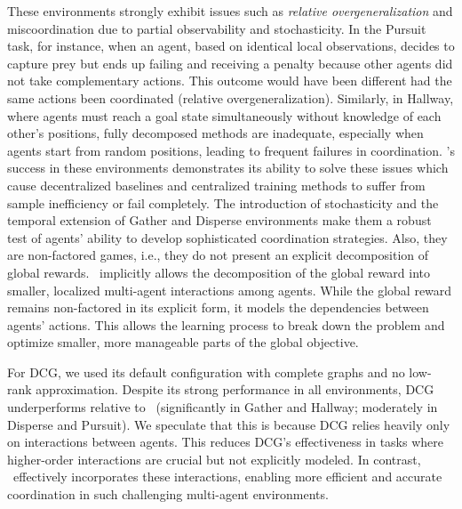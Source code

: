 These environments strongly exhibit issues such as \textit{relative overgeneralization} and miscoordination due to partial observability and stochasticity. In the Pursuit task, for instance, when an agent, based on identical local observations, decides to capture prey but ends up failing and receiving a penalty because other agents did not take complementary actions. This outcome would have been different had the same actions been coordinated (relative overgeneralization). Similarly, in Hallway, where agents must reach a goal state simultaneously without knowledge of each other's positions, fully decomposed methods are inadequate, especially when agents start from random positions, leading to frequent failures in coordination. \algoabb's success in these environments demonstrates its ability to solve these issues which cause decentralized baselines and centralized training methods to suffer from sample inefficiency or fail completely. The introduction of stochasticity and the temporal extension of Gather and Disperse environments make them a robust test of agents' ability to develop sophisticated coordination strategies. Also, they are non-factored games, i.e., they do not present an explicit decomposition of global rewards. \algoabb\ implicitly allows the decomposition of the global reward into smaller, localized multi-agent interactions among agents. While the global reward remains non-factored in its explicit form, it models the dependencies between agents’ actions. This allows the learning process to break down the problem and optimize smaller, more manageable parts of the global objective. 

For DCG, we used its default configuration with complete graphs and no low-rank approximation. Despite its strong performance in all environments, DCG underperforms relative to \algoabb\ (significantly in Gather and Hallway; moderately in Disperse and Pursuit). We speculate that this is because DCG relies heavily only on  interactions between agents. This reduces DCG's effectiveness in tasks where higher-order  interactions are crucial but not explicitly modeled. In contrast, \algoabb\ effectively incorporates these interactions, enabling more efficient and accurate coordination in such challenging multi-agent environments. 

